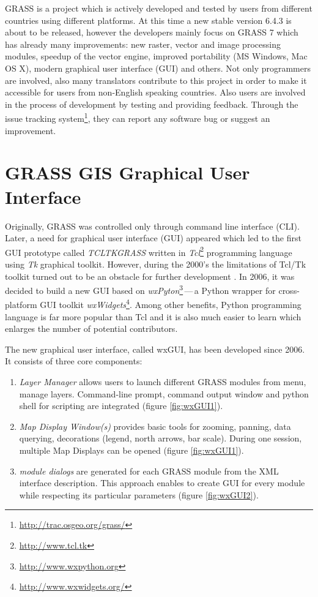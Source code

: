 \documentclass[a4paper,12pt,oneside]{book}
\newcommand{\dash}{\mbox{\,---\,}}
\begin{document}
GRASS is a project which is actively developed and tested by users from different
countries using different platforms.
At this time a new stable version 6.4.3 is about to be released, however
the developers mainly focus on GRASS 7 which has already many improvements:
new raster, vector and image processing modules, speedup of the vector engine,
improved portability (MS Windows, Mac OS X), modern graphical user interface (GUI) and others.
Not only programmers are involved, also many translators contribute to this project
in order to make it accessible for users from non-English speaking countries.
Also users are involved in the process of development by testing and providing feedback.
Through the issue tracking system\footnote{\url{http://trac.osgeo.org/grass/}},
they can report any software bug or suggest an improvement.


\section{GRASS GIS Graphical User Interface}
\label{sec:grasswxgui}
Originally, GRASS was controlled only through command line interface (CLI).
Later, a need for graphical user interface (GUI) appeared
which led to the first GUI prototype called \emph{TCLTKGRASS}
written in \emph{Tcl}\footnote{\url{http://www.tcl.tk}}
programming language using \emph{Tk} graphical toolkit.
However, during the 2000's the limitations of Tcl/Tk toolkit turned out to be
an obstacle for further development \cite{wxGUI2008}.
In 2006, it was decided to build a new GUI based on
\emph{wxPyton}\footnote{\url{http://www.wxpython.org}}\dash  a Python wrapper
for cross-platform GUI toolkit \emph{wxWidgets}\footnote{\url{http://www.wxwidgets.org/}}.
Among other benefits, Python programming language is far more popular than Tcl
and it is also much easier to learn which enlarges the number of potential contributors.

The new graphical user interface, called wxGUI, has been developed since 2006.
It consists of three core components:
    \begin{enumerate}
      \item \emph{Layer Manager} allows users to launch different GRASS modules from menu,
      manage layers. Command-line prompt, command output window and python shell
      for scripting are integrated (figure \ref{fig:wxGUI1}).
      \item \emph{Map Display Window(s)} provides basic tools for zooming, panning, data querying,
      decorations (legend, north arrows, bar scale).
      During one session, multiple Map Displays can be opened (figure \ref{fig:wxGUI1}).
      \item \emph{module dialogs} are generated for each GRASS module from the XML interface description.
      This approach enables to create GUI for every module while respecting its particular parameters
      (figure \ref{fig:wxGUI2}).
    \end{enumerate}
\end{document}
